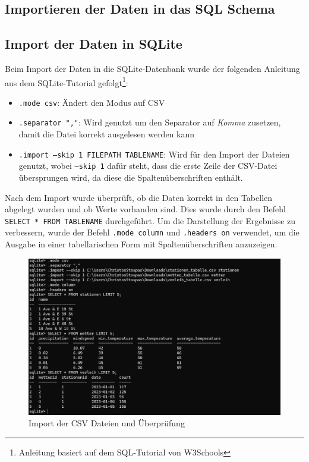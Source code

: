 \documentclass{article}
\begin{document}
\subsection{Importieren der Daten in das SQL Schema}

\subsection*{Import der Daten in SQLite}

Beim Import der Daten in die SQLite-Datenbank wurde der folgenden Anleitung aus dem SQLite-Tutorial gefolgt\footnote{Anleitung basiert auf dem SQL-Tutorial von W3Schools\cite{w3schools_sql}}: 

\begin{itemize}
    \item \texttt{.mode csv}: 
    Ändert den Modus auf CSV
    \item \texttt{.separator ","}:
    Wird genutzt um den Separator auf \textit{Komma} zusetzen, damit die Datei korrekt ausgelesen werden kann
    \item \texttt{.import --skip 1 FILEPATH TABLENAME}:
    Wird für den Import der Dateien genutzt, wobei \texttt{--skip 1} dafür steht, dass die erste Zeile der CSV-Datei übersprungen wird, da diese die Spaltenüberschriften enthält.
\end{itemize}


Nach dem Import wurde überprüft, ob die Daten korrekt in den Tabellen abgelegt wurden und ob Werte vorhanden sind. Dies wurde durch den Befehl \texttt{SELECT * FROM TABLENAME} durchgeführt. Um die Darstellung der Ergebnisse zu verbessern, wurde der Befehl \texttt{.mode column} und \texttt{.headers on} verwendet, um die Ausgabe in einer tabellarischen Form mit Spaltenüberschriften anzuzeigen.
\begin{figure}[ht] 
    \centering
    \includegraphics[width = \textwidth]{Screenshot 2024-11-24 201336.png}
    \caption{Import der CSV Dateien und Überprüfung}
    \label{fig:dax}
\end{figure}
\end{document}
